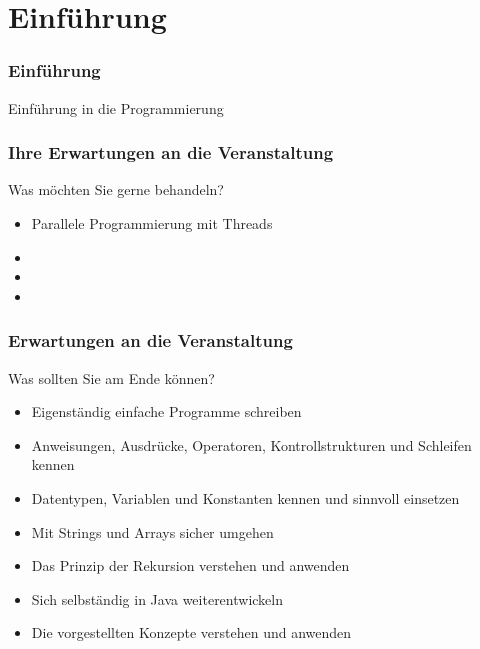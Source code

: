 
\section{Einführung}
\begin{frame}
\frametitle{Einführung}
	\huge Einführung in die Programmierung
\end{frame}

\begin{frame}
\frametitle{Ihre Erwartungen an die Veranstaltung}
	\begin{exampleblock}{Was m\"ochten Sie gerne behandeln?}
		\begin{itemize} 
			 \item{Parallele Programmierung mit Threads}
			 \item{}
			 \item{}
			 \item{}
		\end{itemize}
	\end{exampleblock}
\end{frame}
 
\begin{frame}
\frametitle{Erwartungen an die Veranstaltung}
	\begin{block}{Was sollten Sie am Ende k\"onnen?}
		\begin{itemize}
			 \item{Eigenständig einfache Programme schreiben}
			 \item{Anweisungen, Ausdrücke, Operatoren, Kontrollstrukturen und Schleifen
			 kennen}
			 \item{Datentypen, Variablen und Konstanten kennen und sinnvoll einsetzen}
			 \item{Mit Strings und Arrays sicher umgehen}
			 \item{Das Prinzip der Rekursion verstehen und anwenden}
			 \item{Sich selbständig in Java weiterentwickeln}
			 \item{Die vorgestellten Konzepte verstehen und anwenden}
		\end{itemize}
	\end{block}
\end{frame}

